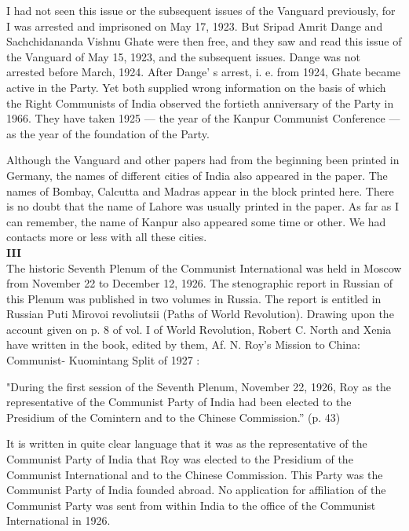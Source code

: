 I had not seen this issue or the subsequent issues of the Vanguard previously, for I was arrested and imprisoned on May 17, 1923. But Sripad Amrit Dange and Sachchidananda Vishnu Ghate were then free, and they saw and read this issue of the Vanguard of May 15, 1923, and the subsequent issues. Dange was not arrested before March, 1924. After Dange’ s arrest, i. e. from 1924, Ghate became active in the Party. Yet 
both supplied wrong information on the basis of which the Right Communists of India observed the fortieth anniversary of the Party in 1966. They have taken 1925 — the year of the Kanpur Communist Conference — as the year of the foundation of the Party. 

Although the Vanguard and other papers had from the beginning been printed in Germany, the names of different cities of India also appeared in the paper. The names of Bombay, Calcutta and Madras appear in the block printed here. There is no doubt that the name of Lahore was usually printed in the paper. As far as I can remember, the name of Kanpur also appeared some time or other. We had contacts more or less with all these cities. \\

\textbf{III}\\

The historic Seventh Plenum of the Communist International was held in Moscow from November 22 to December 12, 1926. The stenographic report in Russian of this Plenum was published in two volumes in Russia. The report is entitled in Russian Puti Mirovoi revoliutsii (Paths of World Revolution). Drawing upon the account given on p. 8 of vol. I of World Revolution, Robert C. North and Xenia have written in the book, edited by them, Af. N. Roy’s Mission to China: Communist- Kuomintang Split of 1927 : 

"During the first session of the Seventh Plenum, November 22, 1926, Roy as the representative of the Communist Party of India had been elected to the Presidium of the Comintern and to the Chinese Commission.” (p. 43) 

It is written in quite clear language that it was as the representative of the Communist Party of India that Roy was elected to the Presidium of the Communist International and 
to the Chinese Commission. This Party was the Communist Party of India founded abroad. No application for affiliation of the Communist Party was sent from within India to the office of the Communist International in 1926. \\

